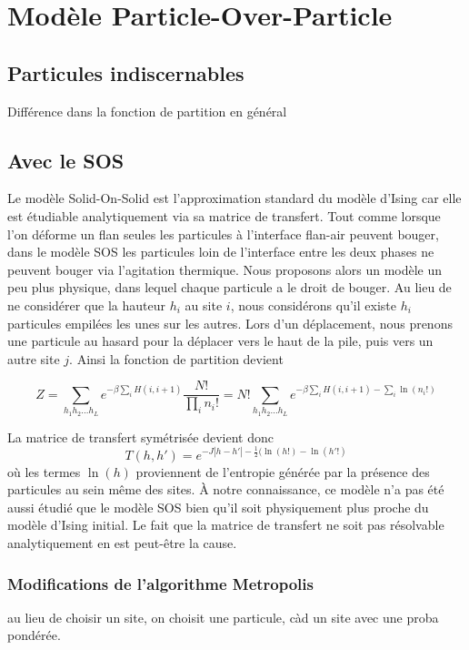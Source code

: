 \chapter{Modèle Particle-Over-Particle }



	\section{Particules indiscernables}
	Différence dans la fonction de partition en général


	\section{Avec le SOS}
	Le modèle Solid-On-Solid est l'approximation standard du modèle d'Ising car elle est étudiable analytiquement via sa matrice de transfert. 	Tout comme lorsque l'on déforme un flan seules les particules à l'interface flan-air peuvent bouger, dans le modèle SOS les particules loin de l'interface entre les deux phases ne peuvent bouger via l'agitation thermique. 
	Nous proposons alors un modèle un peu plus physique, dans lequel chaque particule a le droit de bouger. Au lieu de ne considérer que la hauteur $h_i$ au site $i$, nous considérons qu'il existe $h_i$ particules empilées les unes sur les autres. Lors d'un déplacement, nous prenons une particule au hasard pour la déplacer vers le haut de la pile, puis vers un autre site $j$. 
	Ainsi la fonction de partition devient
	
\begin{equation}
	Z = \sum_{h_1 h_2 ... h_L} e^{- \beta \sum_{i} H(i,i+1)} \frac{N!}{\prod_i n_i!} = N! \sum_{h_1 h_2 ... h_L} e^{- \beta \sum_{i} H(i,i+1) -\sum_i \ln(n_i!)}
\end{equation}

La matrice de transfert symétrisée devient donc
\begin{equation}
	T(h,h') = e^{-J |h-h'| - \frac{1}{2}(\ln(h!)-\ln(h'!)}
\end{equation}
où les termes $\ln(h)$ proviennent de l'entropie générée par la présence des particules au sein même des sites. À notre connaissance, ce modèle n'a pas été aussi étudié que le modèle SOS bien qu'il soit physiquement plus proche du modèle d'Ising initial. Le fait que la matrice de transfert ne soit pas résolvable analytiquement en est peut-être la cause. 
		\subsection{Modifications de l'algorithme Metropolis}
		au lieu de choisir un site, on choisit une particule, càd un site avec une proba pondérée.



